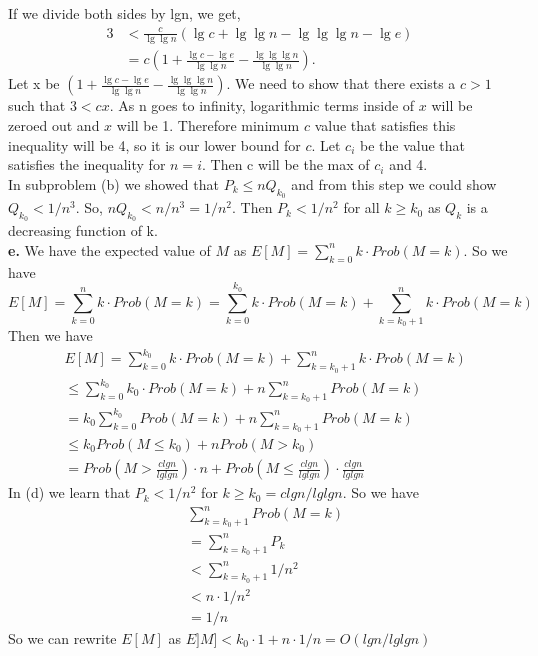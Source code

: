 \documentclass{article}
\begin{document}
If we divide both sides by lgn, we get, 
\begin{align*}
3 &< \frac{c}{\lg\lg n}(\lg c + \lg\lg n - \lg\lg\lg n - \lg e) \\
&= c(1 + \frac{\lg c - \lg e}{\lg\lg n} - \frac{\lg\lg\lg n}{\lg\lg n}).
\end{align*}
Let x be $(1 + \frac{\lg c - \lg e}{\lg\lg n} - \frac{\lg\lg\lg n}{\lg\lg n})$. We need to show that there exists a $c > 1$ such that $3 < cx$. As n goes to infinity, logarithmic terms inside of $x$ will be zeroed out and $x$ will be 1. Therefore minimum $c$ value that satisfies this inequality will be 4, so it is our lower bound for $c$. Let $c_i$ be the value that satisfies the inequality for $n = i$. Then c will be the max of $c_i$ and 4. \\ \newline
In subproblem (b) we showed that $P_k \leq nQ_{k_0}$ and from this step we could show $Q_{k_0} < 1/n^3$. So, $nQ_{k_0} < n/n^3 = 1/n^2$. Then $P_k < 1/n^2$ for all $k \geq k_0$ as $Q_k$ is a decreasing function of k. \\ \newline
\textbf{e.} We have the expected value of $M$ as 
$E[M] = \sum_{k=0}^nk\cdot Prob(M = k)$. So we have 
$$E[M] = \sum_{k=0}^nk\cdot Prob(M = k) = \sum_{k = 0}^{k_{0}}k\cdot Prob(M = k) + \sum_{k = k_0+1}^nk\cdot Prob(M = k)$$
Then we have 
\begin{align*}
&E[M]=\sum_{k = 0}^{k_{0}}k\cdot Prob(M = k) + \sum_{k = k_0+1}^nk\cdot Prob(M = k) \\
&\leq \sum_{k = 0}^{k_{0}}k_0\cdot Prob(M = k) + n\sum_{k = k_0+1}^nProb(M = k)\\
&= k_0\sum_{k = 0}^{k_{0}}Prob(M = k) + n\sum_{k = k_0+1}^nProb(M = k)\\
&\leq k_0Prob(M \leq k_0) + nProb(M > k_0)\\
&= Prob(M > \frac{clgn}{lglgn})\cdot n + Prob(M\leq \frac{clgn}{lglgn})\cdot \frac{clgn}{lglgn}
\end{align*}
In (d) we learn that $P_k < 1/n^2$ for $k \geq k_0 = clgn/lglgn$. So we have
\begin{align*}
&\sum_{k = k_0+1}^nProb(M = k) \\
&=\sum_{k = k_0+1}^nP_k \\
&< \sum_{k = k_0+1}^n1/n^2 \\
&< n\cdot 1/n^2\\
&=1/n
\end{align*}
So we can rewrite $E[M]$ as $E]M] < k_0 \cdot 1 + n\cdot 1/n = O(lgn/lglgn)$
\end{document}
